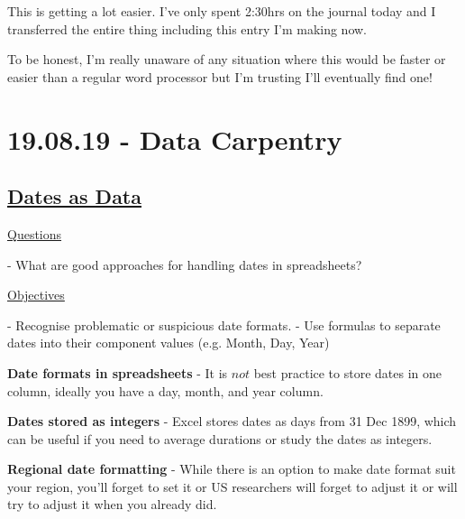 \documentclass[12pt]{article}
\begin{document}
This is getting a lot easier. I've only spent 2:30hrs on the journal today and I transferred the entire thing including this entry I'm making now.

To be honest, I'm really unaware of any situation where this would be faster or easier than a regular word processor but I'm trusting I'll eventually find one!

\newpage\section{19.08.19 - Data Carpentry}

\subsection{\href{https://datacarpentry.org/spreadsheets-socialsci/03-dates-as-data/index.html}{\textbf{Dates as Data}}}

\color{gray}
\underline{Questions}

- What are good approaches for handling dates in spreadsheets?

\underline{Objectives}

- Recognise problematic or suspicious date formats.
\newline - Use formulas to separate dates into their component values (e.g. Month, Day, Year)
\color{black}

\textbf{Date formats in spreadsheets} - It is $not$ best practice to store dates in one column, ideally you have a day, month, and year column.

\textbf{Dates stored as integers} - Excel stores dates as days from 31 Dec 1899, which can be useful if you need to average durations or study the dates as integers.

\textbf{Regional date formatting} - While there is an option to make date format suit your region, you'll forget to set it or US researchers will forget to adjust it or will try to adjust it when you already did.
\end{document}
